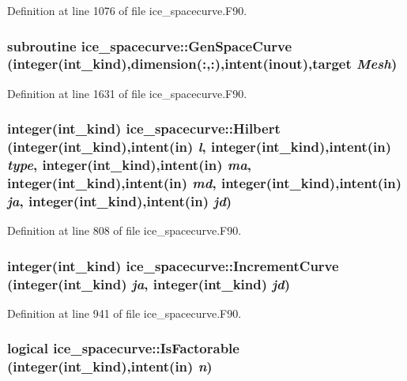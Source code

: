 Definition at line 1076 of file ice\_\-spacecurve.F90.\hypertarget{namespaceice__spacecurve_a317f0810215a0c684a8073ff21eb71b1}{
\subsubsection[{GenSpaceCurve}]{\setlength{\rightskip}{0pt plus 5cm}subroutine ice\_\-spacecurve::GenSpaceCurve (integer(int\_\-kind),dimension(:,:),intent(inout),target {\em Mesh})}}
\label{namespaceice__spacecurve_a317f0810215a0c684a8073ff21eb71b1}


Definition at line 1631 of file ice\_\-spacecurve.F90.\hypertarget{namespaceice__spacecurve_aceffac45ebe5bc652860f543913c8c83}{
\subsubsection[{Hilbert}]{\setlength{\rightskip}{0pt plus 5cm}integer(int\_\-kind) ice\_\-spacecurve::Hilbert (integer(int\_\-kind),intent(in) {\em l}, \/  integer(int\_\-kind),intent(in) {\em type}, \/  integer(int\_\-kind),intent(in) {\em ma}, \/  integer(int\_\-kind),intent(in) {\em md}, \/  integer(int\_\-kind),intent(in) {\em ja}, \/  integer(int\_\-kind),intent(in) {\em jd})}}
\label{namespaceice__spacecurve_aceffac45ebe5bc652860f543913c8c83}


Definition at line 808 of file ice\_\-spacecurve.F90.\hypertarget{namespaceice__spacecurve_a3b9b759e23a9275195d27bdf3b78ebfa}{
\subsubsection[{IncrementCurve}]{\setlength{\rightskip}{0pt plus 5cm}integer(int\_\-kind) ice\_\-spacecurve::IncrementCurve (integer(int\_\-kind) {\em ja}, \/  integer(int\_\-kind) {\em jd})}}
\label{namespaceice__spacecurve_a3b9b759e23a9275195d27bdf3b78ebfa}


Definition at line 941 of file ice\_\-spacecurve.F90.\hypertarget{namespaceice__spacecurve_a918d591b92dcee27d6d7f50c92022d69}{
\subsubsection[{IsFactorable}]{\setlength{\rightskip}{0pt plus 5cm}logical ice\_\-spacecurve::IsFactorable (integer(int\_\-kind),intent(in) {\em n})}}
\label{namespaceice__spacecurve_a918d591b92dcee27d6d7f50c92022d69}


